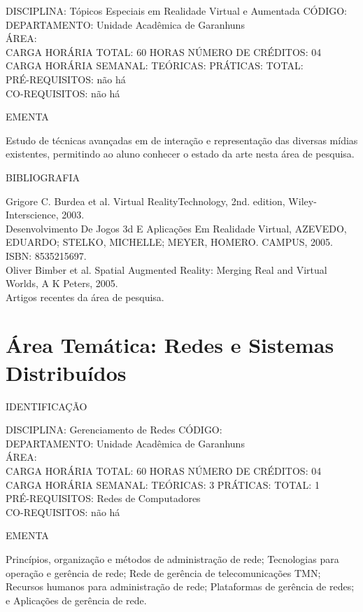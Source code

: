\documentclass[
	12pt,				%
	openright,			%
  oneside,     %
	a4paper,			%
	chapter=TITLE,		%
	english,			%
	french,				%
	spanish,			%
	brazil				%
	]{abntex2}
\begin{document}
\begin{apendicesenv}
DISCIPLINA: Tópicos Especiais em Realidade Virtual e Aumentada CÓDIGO:\\ 
DEPARTAMENTO: Unidade Acadêmica de Garanhuns\\
ÁREA: \\
CARGA HORÁRIA TOTAL: 60 HORAS NÚMERO DE CRÉDITOS: 04\\
CARGA HORÁRIA SEMANAL: TEÓRICAS: PRÁTICAS: TOTAL: \\
PRÉ-REQUISITOS: não há\\
CO-REQUISITOS: não há

EMENTA 

Estudo de técnicas avançadas em de interação e representação das
diversas mídias existentes, permitindo ao aluno conhecer o estado da
arte nesta área de pesquisa.

BIBLIOGRAFIA 

Grigore C. Burdea et al. Virtual RealityTechnology, 2nd. edition,
Wiley-Interscience, 2003.\\
Desenvolvimento De Jogos 3d E Aplicações Em Realidade Virtual, AZEVEDO,
EDUARDO; STELKO, MICHELLE; MEYER, HOMERO. CAMPUS, 2005. ISBN:
8535215697.\\
Oliver Bimber et al. Spatial Augmented Reality: Merging Real and Virtual
Worlds, A K Peters, 2005.\\
Artigos recentes da área de pesquisa.

\section*{Área Temática: Redes e Sistemas Distribuídos}

\newpage IDENTIFICAÇÃO

DISCIPLINA: Gerenciamento de Redes CÓDIGO:\\ 
DEPARTAMENTO: Unidade Acadêmica de Garanhuns\\
ÁREA: \\
CARGA HORÁRIA TOTAL: 60 HORAS NÚMERO DE CRÉDITOS: 04\\
CARGA HORÁRIA SEMANAL: TEÓRICAS: 3 PRÁTICAS: TOTAL: 1 \\
PRÉ-REQUISITOS: Redes de Computadores\\
CO-REQUISITOS: não há

EMENTA 

Princípios, organização e métodos de administração de rede; Tecnologias
para operação e gerência de rede; Rede de gerência de telecomunicações
TMN; Recursos humanos para administração de rede; Plataformas de
gerência de redes; e Aplicações de gerência de rede.


\end{apendicesenv}
\end{document}
